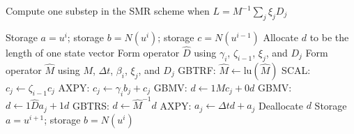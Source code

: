 \documentclass[letterpaper,reqno,11pt]{amsart}
\begin{document}
\begin{algorithm}
\label{alg:substep}
\caption{Compute one substep in the SMR scheme when
         $L=M^{-1} \sum_{j} \xi_j D_{j}$}
\begin{algorithmic}
  \REQUIRE Storage $a = u^i$;
           storage $b = N\left(u^{i}\right)$;
           storage $c = N\left(u^{i-1}\right)$
  \STATE Allocate $d$ to be the length of one state vector
  \STATE Form operator $\hat{D}$ using $\gamma_i$, $\zeta_{i-1}$,
         $\xi_j$, and $D_j$
  \STATE Form operator $\hat{M}$ using $M$, $\Delta{}t$, $\beta_i$,
         $\xi_j$, and $D_j$
  \STATE GBTRF:  $\hat{M}\leftarrow{}\mbox{lu}\left( \hat{M} \right)$
    \STATE SCAL: $c_{j}\leftarrow{}\zeta_{i-1}c_{j}$
    \STATE AXPY: $c_{j}\leftarrow{}\gamma_{i}b_{j}+c_{j}$
    \STATE GBMV: $d\leftarrow{}1 M c_{j} + 0 d$
    \STATE GBMV: $d\leftarrow{}1 \hat{D} a_{j} + 1 d$
    \STATE GBTRS: $d\leftarrow{}\hat{M}^{-1} d$
    \STATE AXPY: $a_{j}\leftarrow{}\Delta{}t d + a_{j}$
  \ENDFOR
  \STATE Deallocate $d$
  \ENSURE Storage $a = u^{i+1}$;
          storage $b = N\left(u^{i}\right)$
\end{algorithmic}
\end{algorithm}
\end{document}
